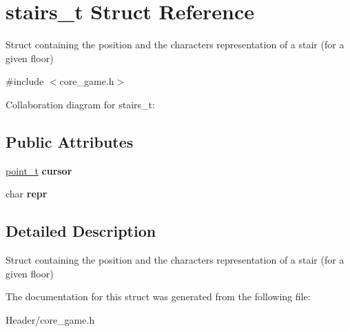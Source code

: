 \hypertarget{structstairs__t}{}\section{stairs\+\_\+t Struct Reference}
\label{structstairs__t}


Struct containing the position and the character\textquotesingle{}s representation of a stair (for a given floor)  




{\ttfamily \#include $<$core\+\_\+game.\+h$>$}



Collaboration diagram for stairs\+\_\+t\+:
\subsection*{Public Attributes}
\begin{DoxyCompactItemize}
\item 
\mbox{\label{structstairs__t_addde845bfa4949feac654bef0661caae}} 
\hyperlink{structpoint__t}{point\+\_\+t} {\bfseries cursor}
\item 
\mbox{\label{structstairs__t_a96ab34770df10b6d2caaf8ae6395008e}} 
char {\bfseries repr}
\end{DoxyCompactItemize}


\subsection{Detailed Description}
Struct containing the position and the character\textquotesingle{}s representation of a stair (for a given floor) 

The documentation for this struct was generated from the following file\+:\begin{DoxyCompactItemize}
\item 
Header/core\+\_\+game.\+h\end{DoxyCompactItemize}
